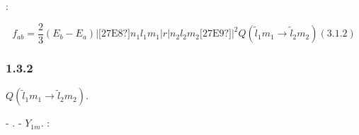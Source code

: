 \documentclass[a4paper]{article}
\begin{document}
{\CYRD}{\cyrl}{\cyrya} {\cyrn}{\cyra}{\cyrsh}{\cyre}{\cyrishrt} {\cyrs}{\cyri}{\cyrs}{\cyrt}{\cyre}{\cyrm}{\cyrery}
{\cyrs}{\cyri}{\cyrl}{\cyra} {\cyro}{\cyrs}{\cyrc}{\cyri}{\cyrl}{\cyrl}{\cyrya}{\cyrt}{\cyro}{\cyrr}{\cyra}
{\cyrb}{\cyru}{\cyrd}{\cyre}{\cyrt} {\cyrv}{\cyrery}{\cyrg}{\cyrl}{\cyrya}{\cyrd}{\cyre}{\cyrt}{\cyrsftsn}
{\cyrt}{\cyra}{\cyrk}{\cyri}{\cyrm} {\cyro}{\cyrb}{\cyrr}{\cyra}{\cyrz}{\cyro}{\cyrm}:

\begin{equation*}
f_{\mathit{ab}}=\frac 2
3\left(E_b-E_a\right)\left|\text{[27E8?]}n_1l_1m_1\left|r\left|n_2l_2m_2\text{[27E9?]}\right.\right.\right|^2Q\left(\widetilde
l_1m_1\rightarrow \widetilde l_2m_2\right)(3.1.2)
\end{equation*}
\subsubsection[1.3.2 {\CYRR}{\cyra}{\cyrs}{\cyrch}{\cyre}{\cyrt} {\cyru}{\cyrg}{\cyrl}{\cyro}{\cyrv}{\cyro}{\cyrishrt}
{\cyrch}{\cyra}{\cyrs}{\cyrt}{\cyri} {\cyrd}{\cyri}{\cyrp}{\cyro}{\cyrl}{\cyrsftsn}{\cyrn}{\cyro}{\cyrg}{\cyro}
{\cyrm}{\cyra}{\cyrt}{\cyrr}{\cyri}{\cyrch}{\cyrn}{\cyro}{\cyrg}{\cyro}
{\cyrerev}{\cyrl}{\cyre}{\cyrm}{\cyre}{\cyrn}{\cyrt}{\cyra}]{1.3.2 {\CYRR}{\cyra}{\cyrs}{\cyrch}{\cyre}{\cyrt}
{\cyru}{\cyrg}{\cyrl}{\cyro}{\cyrv}{\cyro}{\cyrishrt} {\cyrch}{\cyra}{\cyrs}{\cyrt}{\cyri}
{\cyrd}{\cyri}{\cyrp}{\cyro}{\cyrl}{\cyrsftsn}{\cyrn}{\cyro}{\cyrg}{\cyro}
{\cyrm}{\cyra}{\cyrt}{\cyrr}{\cyri}{\cyrch}{\cyrn}{\cyro}{\cyrg}{\cyro}
{\cyrerev}{\cyrl}{\cyre}{\cyrm}{\cyre}{\cyrn}{\cyrt}{\cyra}}
\hypertarget{RefHeading4691463868395}{}{\CYRP}{\cyro}{\cyrs}{\cyrch}{\cyri}{\cyrt}{\cyra}{\cyre}{\cyrm}
{\cyrd}{\cyri}{\cyrp}{\cyro}{\cyrl}{\cyrsftsn}{\cyrn}{\cyrery}{\cyrishrt}
{\cyrm}{\cyra}{\cyrt}{\cyrr}{\cyri}{\cyrch}{\cyrn}{\cyrery}{\cyrishrt}
{\cyrerev}{\cyrl}{\cyre}{\cyrm}{\cyre}{\cyrn}{\cyrt}  $Q\left(\widetilde l_1m_1\rightarrow \widetilde l_2m_2\right)$.

{\CYRU}{\cyrg}{\cyrl}{\cyro}{\cyrv}{\cyra}{\cyrya} {\cyrch}{\cyra}{\cyrs}{\cyrt}{\cyrsftsn}
{\cyrn}{\cyra}{\cyrsh}{\cyre}{\cyrishrt} {\cyrv}{\cyro}{\cyrl}{\cyrn}{\cyro}{\cyrv}{\cyro}{\cyrishrt}
{\cyrf}{\cyru}{\cyrn}{\cyrk}{\cyrc}{\cyri}{\cyri} {\cyre}{\cyrs}{\cyrt}{\cyrsftsn}
{\cyrd}{\cyri}{\cyrp}{\cyro}{\cyrl}{\cyrsftsn}-{\cyrs}{\cyrf}{\cyre}{\cyrr}{\cyri}{\cyrch}{\cyre}{\cyrs}{\cyrk}{\cyra}{\cyrya}
{\cyrf}{\cyru}{\cyrn}{\cyrk}{\cyrc}{\cyri}{\cyrya}. {\CYRU}{\cyrg}{\cyrl}{\cyro}{\cyrv}{\cyrery}{\cyre}
{\cyrch}{\cyra}{\cyrs}{\cyrt}{\cyri}
{\cyrr}{\cyra}{\cyrd}{\cyri}{\cyru}{\cyrs}-{\cyrv}{\cyre}{\cyrk}{\cyrt}{\cyro}{\cyrr}{\cyra}
{\cyrv}{\cyrery}{\cyrr}{\cyra}{\cyrzh}{\cyra}{\cyre}{\cyrt}{\cyrs}{\cyrya} {\cyrch}{\cyre}{\cyrr}{\cyre}{\cyrz}
{\cyrs}{\cyrf}{\cyre}{\cyrr}{\cyri}{\cyrch}{\cyre}{\cyrs}{\cyrk}{\cyri}{\cyre}
{\cyrg}{\cyra}{\cyrr}{\cyrm}{\cyro}{\cyrn}{\cyri}{\cyrk}{\cyri}  $Y_{1m}$.
{\CYRS}{\cyro}{\cyrs}{\cyrch}{\cyri}{\cyrt}{\cyra}{\cyre}{\cyrm}
{\cyrm}{\cyra}{\cyrt}{\cyrr}{\cyri}{\cyrch}{\cyrn}{\cyrery}{\cyrishrt}
{\cyrerev}{\cyrl}{\cyre}{\cyrm}{\cyre}{\cyrn}{\cyrt}
{\cyrs}{\cyrl}{\cyre}{\cyrd}{\cyru}{\cyryu}{\cyrshch}{\cyre}{\cyrg}{\cyro} {\cyrv}{\cyri}{\cyrd}{\cyra}:
\end{document}
